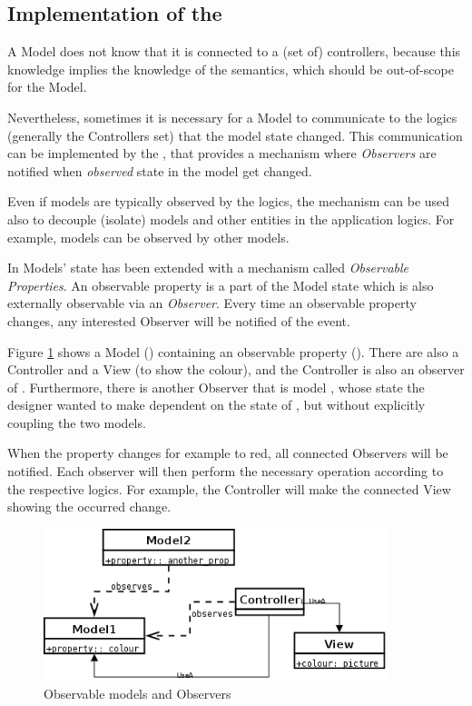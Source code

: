 \subsection{\label{OBS} Implementation of the \obs}

A Model does not know that it is connected to a (set of) controllers,
because this knowledge implies the knowledge of the \gui semantics,
which should be out-of-scope for the Model.

Nevertheless, sometimes it is necessary for a Model to communicate to
the \gui logics (generally the Controllers set) that the model state
changed. This communication can be implemented by the \obs, that
provides a mechanism where \emph{Observers} are notified when
\emph{observed} state in the model get changed.

Even if models are typically observed by the \gui logics, the
mechanism can be used also to decouple (isolate) models and other
entities in the application logics. For example, models can be
observed by other models.

In \pygtkmvc Models' state has been extended with a mechanism called
\emph{Observable Properties}. An observable property is a part of the
Model state which is also externally observable via an
\emph{Observer}. Every time an observable property changes, any
interested Observer will be notified of the event.

Figure \ref{F:OBS} shows a Model () containing an
observable property (). There are also a Controller and a
View (to show the colour), and the Controller is also an observer of
. Furthermore, there is another Observer that is model 
, whose state the designer wanted to make dependent on the
state of , but without explicitly coupling the two models.

When the property  changes for example to red, all connected
Observers will be notified. Each observer will then perform the
necessary operation according to the respective logics. For example,
the Controller will make the connected View showing the occurred
change.

\begin{figure}[htbp]
\begin{center}
\includegraphics[width=10cm]{figs/png/obs}
\caption{\label{F:OBS}Observable models and Observers}
\end{center}
\end{figure}


